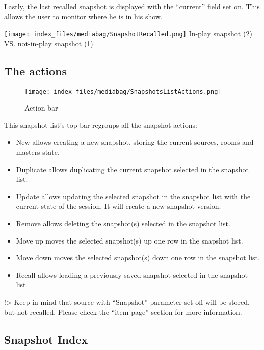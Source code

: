 \documentclass[
  letterpaper,
  DIV=11,
  numbers=noendperiod]{scrreport}
\providecommand{\tightlist}{%
  \setlength{\itemsep}{0pt}\setlength{\parskip}{0pt}}\usepackage{longtable,booktabs,array}
\begin{document}
Lastly, the last recalled snapshot is displayed with the ``current''
field set on. This allows the user to monitor where he is in his show.

\texttt{[image: index\_files/mediabag/SnapshotRecalled.png]} In-play
snapshot (2) VS. not-in-play snapshot (1)

\hypertarget{the-actions}{%
\subsection{The actions}\label{the-actions}}

\begin{figure}

{\centering \texttt{[image: index\_files/mediabag/SnapshotsListActions.png]}

}

\caption{Action bar}

\end{figure}

This snapshot list's top bar regroups all the snapshot actions:

\begin{itemize}
\tightlist
\item
  New allows creating a new snapshot, storing the current sources, rooms
  and masters state.
\item
  Duplicate allows duplicating the current snapshot selected in the
  snapshot list.
\item
  Update allows updating the selected snapshot in the snapshot list with
  the current state of the session. It will create a new snapshot
  version.
\item
  Remove allows deleting the snapshot(s) selected in the snapshot list.
\item
  Move up moves the selected snapshot(s) up one row in the snapshot
  list.
\item
  Move down moves the selected snapshot(s) down one row in the snapshot
  list.
\item
  Recall allows loading a previously saved snapshot selected in the
  snapshot list.
\end{itemize}

!\textgreater{} Keep in mind that source with ``Snapshot'' parameter set
off will be stored, but not recalled. Please check the ``item page''
section for more information.

\hypertarget{snapshot-index}{%
\subsection{Snapshot Index}\label{snapshot-index}}
\end{document}
